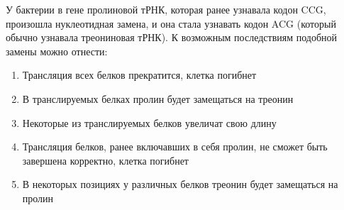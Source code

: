 
У бактерии
в гене пролиновой тРНК, которая ранее узнавала кодон CCG, произошла
нуклеотидная замена, и она стала узнавать кодон ACG (который обычно узнавала
треониновая тРНК). К возможным последствиям подобной замены можно отнести:

\begin{enumerate}
    \item Трансляция всех белков прекратится, клетка погибнет
    \item В транслируемых белках пролин будет замещаться на треонин
    \item Некоторые из транслируемых белков увеличат свою длину
    \item Трансляция белков, ранее включавших в себя пролин, не сможет быть завершена корректно, клетка погибнет
    \item В некоторых позициях у различных белков треонин будет замещаться на пролин
\end{enumerate}



